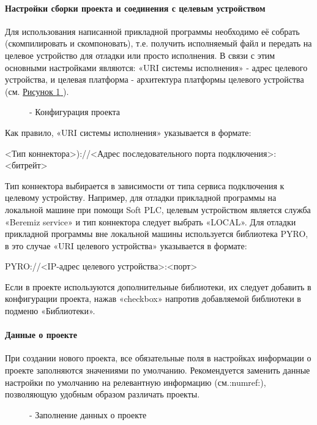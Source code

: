 \documentclass[letterpaper,10pt,russian]{sphinxmanual}
\begin{document}
\paragraph{Настройки сборки проекта и соединения с целевым устройством}
\label{usage_guide/work_with_project:id5}
Для использования написанной прикладной программы необходимо её собрать
(скомпилировать и скомпоновать), т.е. получить исполняемый файл и
передать на целевое устройство для отладки или просто исполнения. В
связи с этим основными настройками являются: «URI системы исполнения» -
адрес целевого устройства, и целевая платформа - архитектура платформы
целевого устройства (см. \hyperref[usage_guide/work_with_project:image150]{Рисунок \ref{usage_guide/work_with_project:image150} }).
\begin{figure}[htbp]
\centering
\capstart

\noindent{}
\caption{- Конфигурация проекта}\label{usage_guide/work_with_project:image150}\end{figure}

Как правило, «URI системы исполнения» указывается в формате:

\textless{}Тип коннектора\textgreater{})://\textless{}Адрес последовательного порта
подключения\textgreater{}:\textless{}битрейт\textgreater{}

Тип коннектора выбирается в зависимости от типа сервиса подключения к
целевому устройству. Например, для отладки прикладной программы на
локальной машине при помощи Soft PLC, целевым устройством является
служба «Beremiz service» и тип коннектора следует выбрать «LOCAL». Для
отладки прикладной программы вне локальной машины используется
библиотека PYRO, в это случае «URI целевого устройства» указывается в
формате:

PYRO://\textless{}IP-адрес целевого устройства\textgreater{}:\textless{}порт\textgreater{}

Если в проекте используются дополнительные библиотеки, их следует
добавить в конфигурации проекта, нажав «checkbox» напротив добавляемой
библиотеки в подменю «Библиотеки».


\paragraph{Данные о проекте}
\label{usage_guide/work_with_project:id6}
При создании нового проекта, все обязательные поля в настройках
информации о проекте заполняются значениями по умолчанию. Рекомендуется
заменить данные настройки по умолчанию на релевантную информацию
(см.:numref:), позволяющую удобным образом различать проекты.
\begin{figure}[htbp]
\centering
\capstart

\noindent{}
\caption{- Заполнение данных о проекте}\label{usage_guide/work_with_project:image152}\end{figure}
\end{document}
